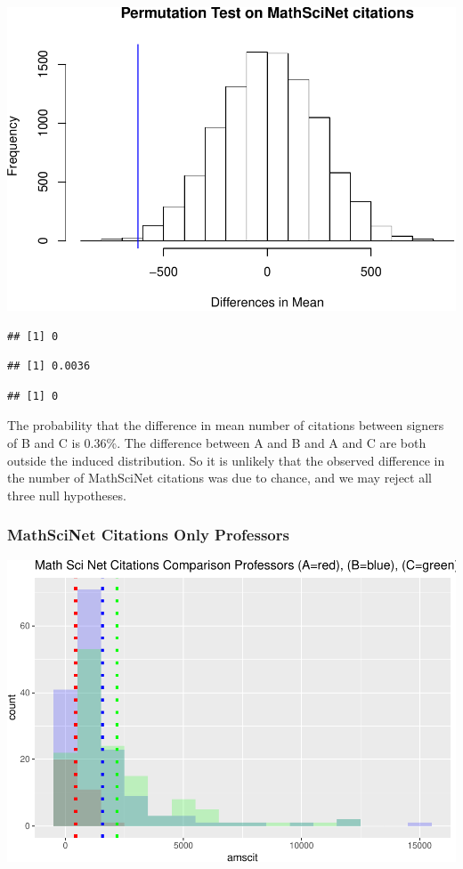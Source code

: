 \documentclass[]{article}
\begin{document}
\includegraphics{final_files/figure-latex/unnamed-chunk-27-1.pdf}

\begin{verbatim}
## [1] 0
\end{verbatim}

\begin{verbatim}
## [1] 0.0036
\end{verbatim}

\begin{verbatim}
## [1] 0
\end{verbatim}

The probability that the difference in mean number of citations between
signers of B and C is 0.36\%. The difference between A and B and A and C
are both outside the induced distribution. So it is unlikely that the
observed difference in the number of MathSciNet citations was due to
chance, and we may reject all three null hypotheses.

\hypertarget{mathscinet-citations-only-professors}{%
\subsubsection{MathSciNet Citations Only
Professors}\label{mathscinet-citations-only-professors}}

\includegraphics{final_files/figure-latex/unnamed-chunk-29-1.pdf}
\end{document}
